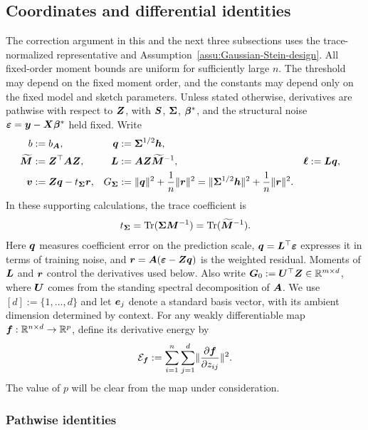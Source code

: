 \documentclass{article}
\theoremstyle{plain} %
\theoremstyle{definition} %
\theoremstyle{definition} %
\begin{document}
\subsection{Coordinates and differential identities}
\label{app:balanced-transfer-setup}
The correction argument in this and the next three subsections uses the
trace-normalized representative and
Assumption~\ref{assu:Gaussian-Stein-design}. All fixed-order moment bounds
are uniform for sufficiently large $n$. The threshold may depend on the
fixed moment order, and the constants may depend only on the fixed model
and sketch parameters. Unless stated otherwise, derivatives are
pathwise with respect to $\boldsymbol{Z}$, with $\boldsymbol{S}$, $\boldsymbol{\Sigma}$, $\boldsymbol{\beta}^*$, and
the structural noise ${\boldsymbol{\varepsilon} }=\boldsymbol{y}-\boldsymbol{X}\boldsymbol{\beta}^*$ held fixed. Write
\begin{align*}
    b&:=b_{\boldsymbol{A}},
    & \boldsymbol{q}&:=\boldsymbol{\Sigma}^{1/2}\boldsymbol{h},\\
    \widetilde{\boldsymbol{M}}&:=\boldsymbol{Z}^\top\boldsymbol{A}\boldsymbol{Z},
    & \boldsymbol{L}&:=\boldsymbol{A}\boldsymbol{Z}\widetilde{\boldsymbol{M}}^{-1},
    & \boldsymbol{\ell}&:=\boldsymbol{L}\boldsymbol{q},\\
    \boldsymbol{v}&:=\boldsymbol{Z}\boldsymbol{q}-t_{\boldsymbol{\Sigma}}\boldsymbol{r},
    & G_{\boldsymbol{\Sigma}}&:=\lVert\boldsymbol{q}\rVert^2+\frac{1}{n}\lVert\boldsymbol{r}\rVert^2
      =\lVert\boldsymbol{\Sigma}^{1/2}\boldsymbol{h}\rVert^2+\frac{1}{n}\lVert\boldsymbol{r}\rVert^2.
\end{align*}
In these supporting calculations, the trace coefficient is
\begin{align*}
    t_{\boldsymbol{\Sigma}}=\operatorname{Tr}(\boldsymbol{\Sigma}\boldsymbol{M}^{-1})
       =\operatorname{Tr}(\widetilde{\boldsymbol{M}}^{-1}).
\end{align*}
Here $\boldsymbol{q}$ measures coefficient error on the prediction scale,
$\boldsymbol{q}=\boldsymbol{L}^\top{\boldsymbol{\varepsilon} }$ expresses it in terms of training noise, and
$\boldsymbol{r}=\boldsymbol{A}({\boldsymbol{\varepsilon} }-\boldsymbol{Z}\boldsymbol{q})$ is the weighted residual. Moments of $\boldsymbol{L}$
and $\boldsymbol{r}$ control the derivatives used below. Also write
$\boldsymbol{G}_0:=\boldsymbol{U}^\top\boldsymbol{Z}\in{\mathbb{R}}^{m\times d}$, where $\boldsymbol{U}$ comes
from the standing spectral decomposition of $\boldsymbol{A}$. We use
$[d]:=\{1,\ldots,d\}$ and let $\boldsymbol{e}_j$ denote a standard basis vector,
with its ambient dimension determined by context.
For any weakly differentiable map
$\boldsymbol{f}:{\mathbb{R}}^{n\times d}\to{\mathbb{R}}^p$, define its derivative energy by
\begin{equation*}
    {\mathcal E}_{\boldsymbol{f}}:=\sum_{i=1}^n\sum_{j=1}^d
    \lVert\pdv{\boldsymbol{f}}{z_{ij}}\rVert^2.
\end{equation*}
The value of $p$ will be clear from the map under consideration.

\subsubsection{Pathwise identities}
\label{app:differential-proofs}
\end{document}

